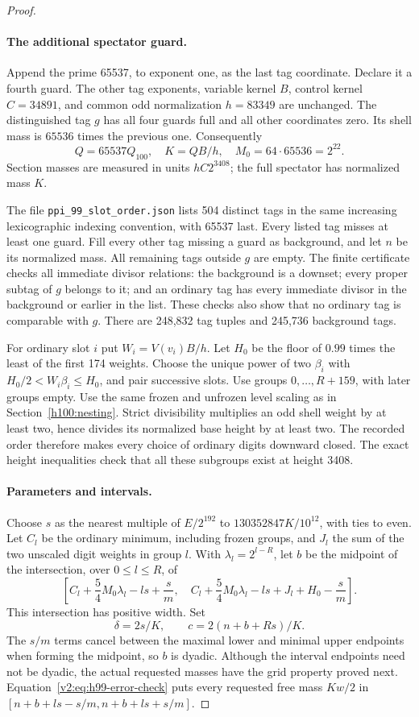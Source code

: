 \documentclass[11pt]{article}
\numberwithin{equation}{section}
\theoremstyle{definition}
\theoremstyle{remark}
\begin{document}
\begin{proof}
\paragraph{The additional spectator guard.}
Append the prime 65537, to exponent one, as the last tag coordinate. Declare it a fourth guard. The other tag exponents, variable kernel $B$, control kernel $C=34891$, and common odd normalization $h=83349$ are unchanged. The distinguished tag $g$ has all four guards full and all other coordinates zero. Its shell mass is $65536$ times the previous one. Consequently
\[
 Q=65537Q_{100},\quad K=QB/h,\quad M_0=64\cdot65536=2^{22}.
\]
Section masses are measured in units $hC2^{3408}$; the full spectator has normalized mass $K$.

The file \texttt{ppi\_99\_slot\_order.json} lists 504 distinct tags in the same increasing lexicographic indexing convention, with 65537 last. Every listed tag misses at least one guard. Fill every other tag missing a guard as background, and let $n$ be its normalized mass. All remaining tags outside $g$ are empty. The finite certificate checks all immediate divisor relations: the background is a downset; every proper subtag of $g$ belongs to it; and an ordinary tag has every immediate divisor in the background or earlier in the list. These checks also show that no ordinary tag is comparable with $g$. There are 248,832 tag tuples and 245,736 background tags.

For ordinary slot $i$ put $W_i=V(v_i)B/h$. Let $H_0$ be the floor of $0.99$ times the least of the first 174 weights. Choose the unique power of two $\beta_i$ with $H_0/2<W_i\beta_i\leq H_0$, and pair successive slots. Use groups $0,\ldots,R+159$, with later groups empty. Use the same frozen and unfrozen level scaling as in Section~\ref{h100:nesting}. Strict divisibility multiplies an odd shell weight by at least two, hence divides its normalized base height by at least two. The recorded order therefore makes every choice of ordinary digits downward closed. The exact height inequalities check that all these subgroups exist at height 3408.

\paragraph{Parameters and intervals.}
Choose $s$ as the nearest multiple of $E/2^{192}$ to $130352847K/10^{12}$, with ties to even. Let $C_l$ be the ordinary minimum, including frozen groups, and $J_l$ the sum of the two unscaled digit weights in group $l$. With $\lambda_l=2^{l-R}$, let $b$ be the midpoint of the intersection, over $0\leq l\leq R$, of
\[
 \left[C_l+\frac54M_0\lambda_l-ls+\frac{s}{m},\quad
 C_l+\frac54M_0\lambda_l-ls+J_l+H_0-\frac{s}{m}\right].
\]
This intersection has positive width. Set
\[
 \delta=2s/K,\qquad c=2(n+b+Rs)/K.
\]
The $s/m$ terms cancel between the maximal lower and minimal upper endpoints when forming the midpoint, so $b$ is dyadic. Although the interval endpoints need not be dyadic, the actual requested masses have the grid property proved next. Equation~\eqref{v2:eq:h99-error-check} puts every requested free mass $Kw/2$ in
$[n+b+ls-s/m,n+b+ls+s/m]$.


\end{proof}
\end{document}
